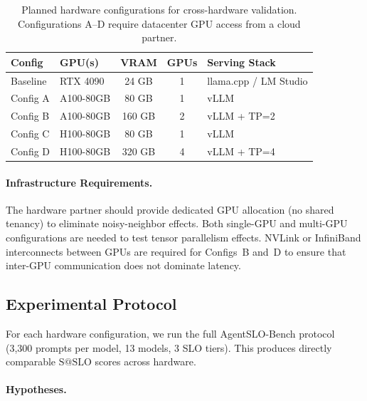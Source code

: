 \documentclass[11pt]{article}
\makeatletter
\newcommand{\sslo}{\ensuremath{\mathrm{S@SLO}}}
\makeatother
\begin{document}
\begin{table}[t]
\centering
\caption{Planned hardware configurations for cross-hardware validation. Configurations A--D require datacenter GPU access from a cloud partner.}
\label{tab:hardware}
\small
\begin{tabular}{llccl}
\toprule
\textbf{Config} & \textbf{GPU(s)} & \textbf{VRAM} & \textbf{GPUs} & \textbf{Serving Stack} \\
\midrule
Baseline & RTX 4090 & 24 GB & 1 & llama.cpp / LM Studio \\
Config A & A100-80GB & 80 GB & 1 & vLLM \\
Config B & A100-80GB & 160 GB & 2 & vLLM + TP=2 \\
Config C & H100-80GB & 80 GB & 1 & vLLM \\
Config D & H100-80GB & 320 GB & 4 & vLLM + TP=4 \\
\bottomrule
\end{tabular}
\end{table}

\paragraph{Infrastructure Requirements.} The hardware partner should provide dedicated GPU allocation (no shared tenancy) to eliminate noisy-neighbor effects. Both single-GPU and multi-GPU configurations are needed to test tensor parallelism effects. NVLink or InfiniBand interconnects between GPUs are required for Configs~B and~D to ensure that inter-GPU communication does not dominate latency.

\subsection{Experimental Protocol}

For each hardware configuration, we run the full AgentSLO-Bench protocol (3,300 prompts per model, 13 models, 3 SLO tiers). This produces directly comparable $\sslo{}$ scores across hardware.

\paragraph{Hypotheses.}
\end{document}
